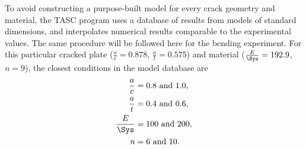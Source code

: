 To avoid constructing a purpose-built model for every crack geometry and material, the TASC program uses a database of results from models of standard dimensions, and interpolates numerical results comparable to the experimental values.
The same procedure will be followed here for the bending experiment.
For this particular cracked plate (\(\frac{a}{c}=0.878\), \(\frac{a}{t}=0.575\)) and material (\(\frac{E}{\Sys}=192.9\), \(n=9\)), the closest conditions in the model database are
\begin{align*}
\frac{a}{c} &= 0.8 \text{ and } 1.0, \\
\frac{a}{t} &= 0.4 \text{ and } 0.6, \\
\frac{E}{\Sys} &= 100 \text{ and } 200, \\
n &= 6 \text{ and } 10.
\end{align*}

